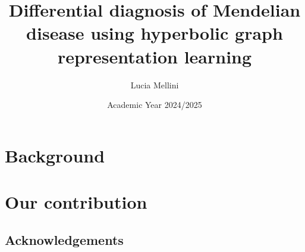 \documentclass[a4paper, dottedtoc]{book}
\title{Differential diagnosis of Mendelian disease using hyperbolic graph representation learning}
\author{Lucia Mellini}
\date{Academic Year 2024/2025}
\begin{document}
\tikzifexternalizing{}{}


\maketitle

\frontmatter

\tableofcontents
   
\mainmatter
\setcounter{chapter}{-1}

\part*{\large Background}




\part*{\large Our contribution}






\chapter*{Acknowledgements}
\end{document}
